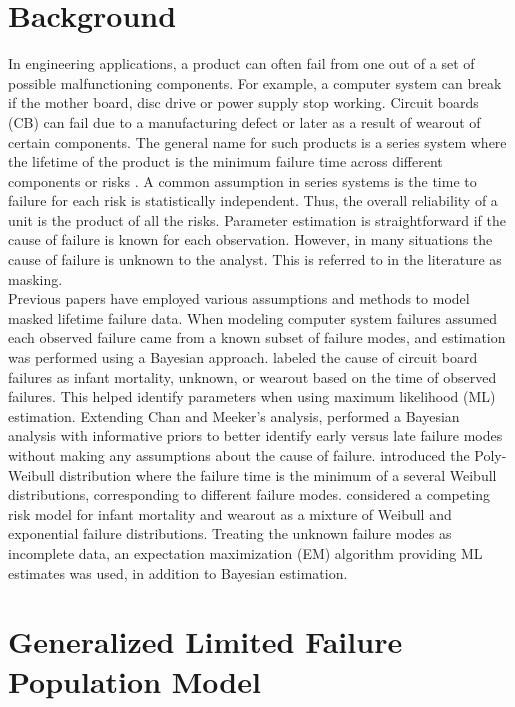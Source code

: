 \documentclass[aoas]{imsart}
\begin{document}
\section{Background}
\label{sec:Background}
In engineering applications, a product can often fail from one out of a set of possible malfunctioning components.  For example, a computer system can break if the mother board, disc drive or power supply stop working.  Circuit boards (CB) can fail due to a manufacturing defect or later as a result of wearout of certain components.  The general name for such products is a series system where the lifetime of the product is the minimum failure time across different components or risks \citep[Chapter 5]{nelson}.  A common assumption in series systems is the time to failure for each risk is statistically independent.  Thus, the overall reliability of a unit is the product of all the risks.  Parameter estimation is straightforward if the cause of failure is known for each observation.  However, in many situations the cause of failure is unknown to the analyst. This is referred to in the literature as masking.\\

Previous papers have employed various assumptions and methods to model masked lifetime failure data.  When modeling computer system failures \citet{reiser} assumed each observed failure came from a known subset of failure modes, and estimation was performed using a Bayesian approach.  \cite{chan} labeled the cause of circuit board failures as infant mortality, unknown, or wearout based on the time of observed failures.  This helped identify parameters when using maximum likelihood (ML) estimation.  Extending Chan and Meeker's analysis, \citet{basu} performed a Bayesian analysis with informative priors to better identify early versus late failure modes without making any assumptions about the cause of failure.  \cite{berger} introduced the Poly-Weibull distribution where the failure time is the minimum of a several Weibull distributions, corresponding to different failure modes.  \cite{ranjan} considered a competing risk model for infant mortality and wearout as a mixture of Weibull and exponential failure distributions.  Treating the unknown failure modes as incomplete data, an expectation maximization (EM) algorithm providing ML estimates was used, in addition to Bayesian estimation.


\section{Generalized Limited Failure Population Model}
\label{sec:GLFP model}
\end{document}
